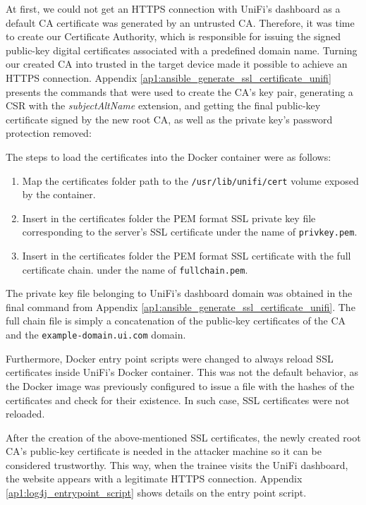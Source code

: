 At first, we could not get an HTTPS connection with UniFi's dashboard as a default CA certificate was generated by an untrusted CA. Therefore, it was time to create our Certificate Authority, which is responsible for issuing the signed public-key digital certificates associated with a predefined domain name. Turning our created CA into trusted in the target device made it possible to achieve an HTTPS connection. Appendix \ref{ap1:ansible_generate_ssl_certificate_unifi} presents the commands that were used to create the CA's key pair, generating a CSR with the \textit{subjectAltName} extension, and getting the final public-key certificate signed by the new root CA, as well as the private key's password protection removed:


The steps to load the certificates into the Docker container were as follows:

\begin{enumerate}
    \item Map the certificates folder path to the \texttt{/usr/lib/unifi/cert} volume exposed by the container.
    \item Insert in the certificates folder the PEM format SSL private key file corresponding to the server's SSL certificate under the name of \texttt{privkey.pem}.
    \item Insert in the certificates folder the PEM format SSL certificate with the full certificate chain. under the name of \texttt{fullchain.pem}.
\end{enumerate}

The private key file belonging to UniFi's dashboard domain was obtained in the final command from Appendix \ref{ap1:ansible_generate_ssl_certificate_unifi}. The full chain file is simply a concatenation of the public-key certificates of the CA and the \texttt{example-domain.ui.com} domain. 

Furthermore, Docker entry point scripts were changed to always reload SSL certificates inside UniFi's Docker container. This was not the default behavior, as the Docker image was previously configured to issue a file with the hashes of the certificates and check for their existence. In such case, SSL certificates were not reloaded.


After the creation of the above-mentioned SSL certificates, the newly created root CA's public-key certificate is needed in the attacker machine so it can be considered trustworthy. This way, when the trainee visits the UniFi dashboard, the website appears with a legitimate HTTPS connection. Appendix \ref{ap1:log4j_entrypoint_script} shows details on the entry point script.

